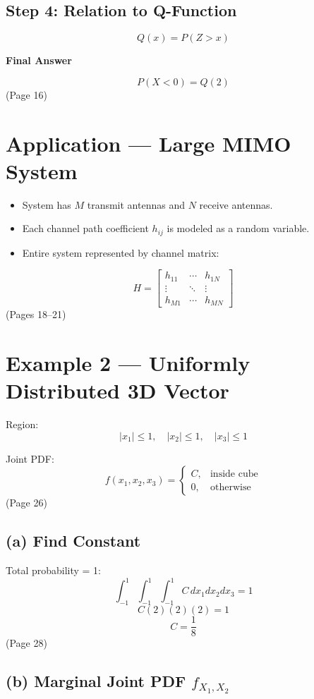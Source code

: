 \documentclass{article}
\begin{document}
\subsection*{Step 4: Relation to Q-Function}
\[Q(x)=P(Z>x)\]

\textbf{Final Answer}

\[P(X<0)=Q(2)\]
(Page 16)

\section*{Application — Large MIMO System}
\begin{itemize}
    \item System has $M$ transmit antennas and $N$ receive antennas.
    \item Each channel path coefficient $h_{ij}$ is modeled as a random variable.
    \item Entire system represented by channel matrix:
\end{itemize}
\[H=\begin{bmatrix}
h_{11} & \cdots & h_{1N} \\
\vdots & \ddots & \vdots \\
h_{M1} & \cdots & h_{MN}
\end{bmatrix}\]
(Pages 18–21)

\section*{Example 2 — Uniformly Distributed 3D Vector}

Region:
\[|x_1|\le1,\quad |x_2|\le1,\quad |x_3|\le1\]

Joint PDF:
\[f(x_1,x_2,x_3)=
\begin{cases}
C,& \text{inside cube}\\
0,& \text{otherwise}
\end{cases}\]
(Page 26)

\subsection*{(a) Find Constant}
Total probability = 1:
\[\int_{-1}^{1}\int_{-1}^{1}\int_{-1}^{1}C\,dx_1dx_2dx_3=1\]
\[C(2)(2)(2)=1\]
\[C=\frac{1}{8}\]
(Page 28)

\subsection*{(b) Marginal Joint PDF $f_{X_1,X_2}$}
\end{document}
